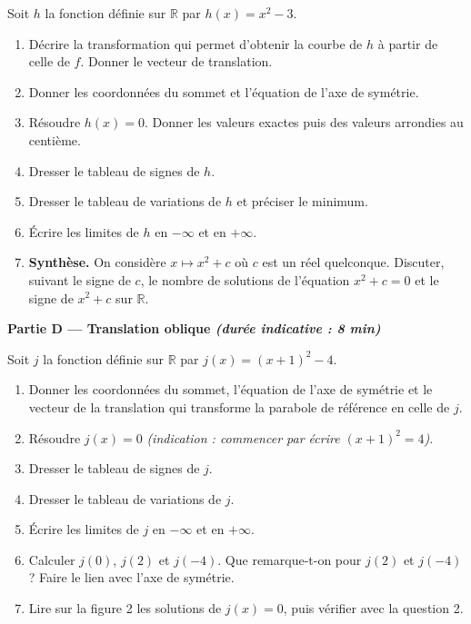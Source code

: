 \documentclass[11pt,a4paper]{article}
\newcommand{\R}{\mathbb{R}}
\newcommand{\partie}[2]{%
  \vspace{6pt}
  \noindent\colorbox{blue!12}{\parbox{\dimexpr\linewidth-2\fboxsep}{%
    \bfseries\color{blue!50!black} #1 \hfill \normalfont\small\itshape (durée indicative : #2)}}%
  \vspace{4pt}}
\begin{document}
Soit $h$ la fonction définie sur $\R$ par $h(x)=x^2-3$.

\begin{enumerate}[leftmargin=1.4em,itemsep=3pt]
  \item Décrire la transformation qui permet d'obtenir la courbe de $h$ à partir de celle de $f$.
  Donner le vecteur de translation.

  \item Donner les coordonnées du sommet et l'équation de l'axe de symétrie.

  \item Résoudre $h(x)=0$. Donner les valeurs exactes puis des valeurs arrondies au centième.

  \item Dresser le tableau de signes de $h$.

  \item Dresser le tableau de variations de $h$ et préciser le minimum.

  \item Écrire les limites de $h$ en $-\infty$ et en $+\infty$.

  \item \textbf{Synthèse.} On considère $x\mapsto x^2+c$ où $c$ est un réel quelconque.
  Discuter, suivant le signe de $c$, le nombre de solutions de l'équation $x^2+c=0$
  et le signe de $x^2+c$ sur $\R$.
\end{enumerate}

\partie{Partie D — Translation oblique}{8 min}

Soit $j$ la fonction définie sur $\R$ par $j(x)=(x+1)^2-4$.

\begin{enumerate}[leftmargin=1.4em,itemsep=3pt]
  \item Donner les coordonnées du sommet, l'équation de l'axe de symétrie et le vecteur de la translation
  qui transforme la parabole de référence en celle de $j$.

  \item Résoudre $j(x)=0$ \emph{(indication : commencer par écrire $(x+1)^2=4$)}.

  \item Dresser le tableau de signes de $j$.

  \item Dresser le tableau de variations de $j$.

  \item Écrire les limites de $j$ en $-\infty$ et en $+\infty$.

  \item Calculer $j(0)$, $j(2)$ et $j(-4)$. Que remarque-t-on pour $j(2)$ et $j(-4)$ ?
  Faire le lien avec l'axe de symétrie.

  \item Lire sur la figure 2 les solutions de $j(x)=0$, puis vérifier avec la question 2.
\end{enumerate}
\end{document}
